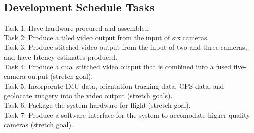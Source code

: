 \documentclass[letterpaper,10pt,serif,draftclsnofoot,onecolumn,compsoc,titlepage]{IEEEtran}
\begin{document}
\subsection{Development Schedule Tasks}
Task 1: Have hardware procured and assembled.\\
Task 2: Produce a tiled video output from the input of six cameras.\\
Task 3: Produce stitched video output from the input of two and three cameras, 
and have latency estimates produced.\\
Task 4: Produce a dual stitched video output that is combined into a fused 
five-camera output (stretch goal).\\
Task 5: Incorporate IMU data, orientation tracking data, GPS data, and 
geolocate imagery into the video output (stretch goals).\\
Task 6: Package the system hardware for flight (stretch goal).\\
Task 7: Produce a software interface for the system to accomodate higher 
quality cameras (stretch goal).\\
\end{document}

